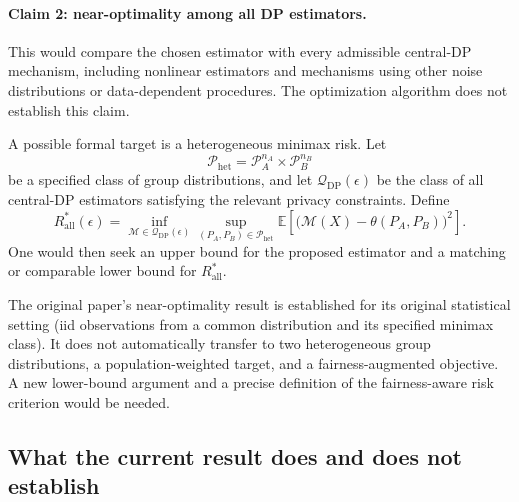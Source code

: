 \documentclass[11pt,a4paper]{article}
\newcommand{\E}{\mathbb{E}}
\newcommand{\1}{\mathbf{1}}
\begin{document}
\paragraph{Claim 2: near-optimality among all DP estimators.}
This would compare the chosen estimator with every admissible central-DP
mechanism, including nonlinear estimators and mechanisms using other
noise distributions or data-dependent procedures. The optimization
algorithm does not establish this claim.

A possible formal target is a heterogeneous minimax risk. Let
\[
  \mathcal P_{\mathrm{het}}
  =\mathcal P_A^{n_A}\times\mathcal P_B^{n_B}
\]
be a specified class of group distributions, and let
\(\mathcal Q_{\mathrm{DP}}(\epsilon)\) be the class of all central-DP
estimators satisfying the relevant privacy constraints. Define
\begin{equation}
  R_{\mathrm{all}}^*(\epsilon)
  =
  \inf_{\mathcal M\in\mathcal Q_{\mathrm{DP}}(\epsilon)}
  \sup_{(P_A,P_B)\in\mathcal P_{\mathrm{het}}}
  \E\left[
    \bigl(\mathcal M(X)-\theta(P_A,P_B)\bigr)^2
  \right].
\end{equation}
One would then seek an upper bound for the proposed estimator and a
matching or comparable lower bound for \(R_{\mathrm{all}}^*\).

The original paper's near-optimality result is established for its
original statistical setting (iid observations from a common
distribution and its specified minimax class). It does not automatically
transfer to two heterogeneous group distributions, a population-weighted
target, and a fairness-augmented objective. A new lower-bound argument
and a precise definition of the fairness-aware risk criterion would be
needed.

\subsection{What the current result does and does not establish}
\end{document}
